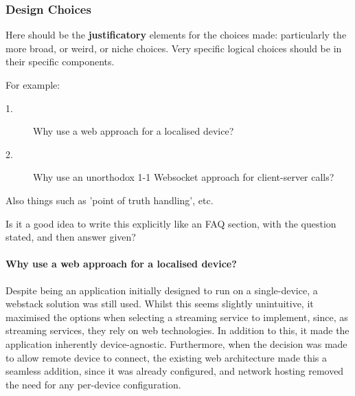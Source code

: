             \subsubsection{Design Choices}
                \begin{temp}
                    Here should be the \textbf{justificatory} elements for the choices made: particularly the more broad, or weird, or niche choices. Very specific logical choices should be in their specific components.
                
                    For example:
                    \begin{description}
                        \item[1.] Why use a web approach for a localised device?
                        \item[2.] Why use an unorthodox 1-1 Websocket approach for client-server calls?
                    \end{description}
                    Also things such as 'point of truth handling', etc.
    
                    Is it a good idea to write this explicitly like an FAQ section, with the question stated, and then answer given?
                \end{temp}
    
                \paragraph{Why use a web approach for a localised device?} Despite being an application initially designed to run on a single-device, a webstack solution was still used. Whilst this seems slightly unintuitive, it maximised the options when selecting a streaming service to implement, since, as streaming services, they rely on web technologies. In addition to this, it made the application inherently device-agnostic. Furthermore, when the decision was made to allow remote device to connect, the existing web architecture made this a seamless addition, since it was already configured, and network hosting removed the need for any per-device configuration. 
    
